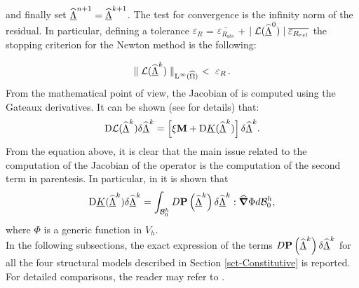 and finally set $\widehat{\underline{\Lambda}}^{n+1} = \widehat{\underline{\Lambda}}^{k+1}$.  The test for convergence is
the infinity norm of the residual. In particular, defining a tolerance
$\varepsilon_{R}$ = $\overline{\varepsilon_{R_{abs}}}$ +
$\mid{\mathcal{L}(\widehat{\underline{\Lambda}}^{0})}\mid\overline{\varepsilon_{R_{rel}}}$ the
stopping criterion for the Newton method is the following:

\begin{equation}
  \parallel{\mathcal{L}(\widehat{\underline{\Lambda}}^{k})}\parallel_{\text{L}^{\infty}(\widehat{\Omega})}\,\,
  <\,\,\varepsilon_{R}\,.
\end{equation}
From the mathematical point of view, the Jacobian of
\Lne{} is computed using the Gateaux derivatives. It can be shown (see
\cite{Deluca} for details) that:
\begin{equation}
  \text{D}\mathcal{L}(\widehat{\underline{\Lambda}}^{k})\delta\widehat{\underline{\Lambda}}^{k}=\left[\xi\textbf{M}+\text{D}\underline{K}(\widehat{\underline{\Lambda}}^{k})
  \right]\delta\widehat{\underline{\Lambda}}^{k}.
  \label{eq::GeneralJacobian}
\end{equation}
From the equation above, it is clear that the main
issue related to the computation of the Jacobian of the operator \Lne
is the computation of the second term in parentesis. In particular, in
\cite{Deluca} it is shown that
\begin{equation} \text{D}\underline{K}(\widehat{\underline{\Lambda}}^{k})\delta\widehat{\underline{\Lambda}}^{k} =
  \int_{\mathcal{B}_0^h}D\textbf{P}\left(\widehat{\underline{\Lambda}}^{k}\right)\delta\widehat{\underline{\Lambda}}^{k}:\widehat{\boldsymbol{\nabla}}\Phi
  d\mathcal{B}_0^h,
  \label{eq::LinearizationK}
\end{equation}
where $\Phi$ is a generic function in $V_h$.\\ In the
following subsections, the exact expression of the terms
$D\textbf{P}\left(\widehat{\underline{\Lambda}}^{k}\right)\delta\widehat{\underline{\Lambda}}^{k}$ for all the four
structural models described in Section \ref{sct-Constitutive} is
reported. For detailed comparisons, the reader may refer to
\cite{Deluca}.

